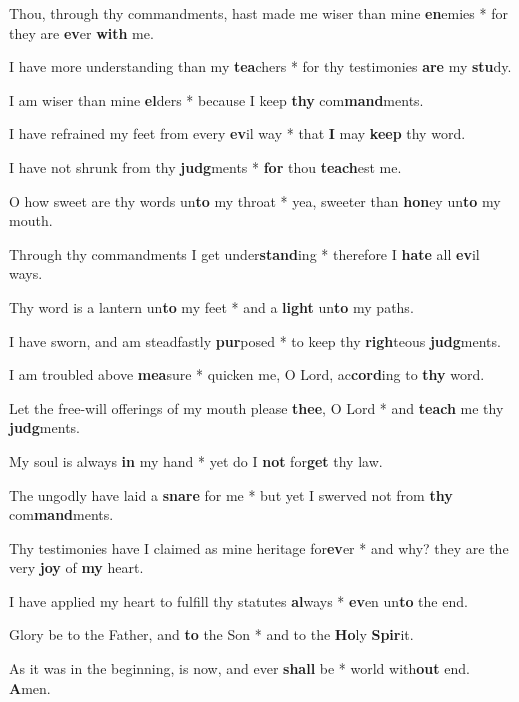 \begin{multicols}{2}
	Thou, through thy commandments, hast made me wiser than mine \textbf{en}emies * for they are \textbf{ev}er \textbf{with} me.
	
	I have more understanding than my \textbf{tea}chers * for thy testimonies \textbf{are} my \textbf{stu}dy.
	
	I am wiser than mine \textbf{el}ders * because I keep \textbf{thy} com\textbf{mand}ments.
	
	I have refrained my feet from every \textbf{ev}il way * that \textbf{I} may \textbf{keep} thy word.
	
	I have not shrunk from thy \textbf{judg}ments * \textbf{for} thou \textbf{teach}est me.
	
	O how sweet are thy words un\textbf{to} my throat * yea, sweeter than \textbf{hon}ey un\textbf{to} my mouth.
	
	Through thy commandments I get under\textbf{stand}ing * therefore I \textbf{hate} all \textbf{ev}il ways.
	
	Thy word is a lantern un\textbf{to} my feet * and a \textbf{light} un\textbf{to} my paths.
	
	I have sworn, and am steadfastly \textbf{pur}posed * to keep thy \textbf{righ}teous \textbf{judg}ments.
	
	I am troubled above \textbf{mea}sure * quicken me, O Lord, ac\textbf{cord}ing to \textbf{thy} word.
	
	Let the free-will offerings of my mouth please \textbf{thee}, O Lord * and \textbf{teach} me thy \textbf{judg}ments.
	
	My soul is always \textbf{in} my hand * yet do I \textbf{not} for\textbf{get} thy law.
	
	The ungodly have laid a \textbf{snare} for me * but yet I swerved not from \textbf{thy} com\textbf{mand}ments.
	
	Thy testimonies have I claimed as mine heritage for\textbf{ev}er * and why? they are the very \textbf{joy} of \textbf{my} heart.
	
	I have applied my heart to fulfill thy statutes \textbf{al}ways * \textbf{ev}en un\textbf{to} the end.
	
	Glory be to the Father, and \textbf{to} the Son * and to the \textbf{Ho}ly \textbf{Spir}it.
	
	As it was in the beginning, is now, and ever \textbf{shall} be * world with\textbf{out} end. \textbf{A}men.
\end{multicols}